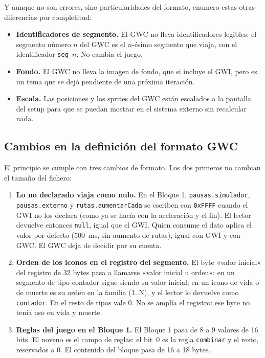 Y aunque no son errores, sino particularidades del formato, enumero estas otras diferencias por completitud:

\begin{itemize}
	\item \textbf{Identificadores de segmento.} El GWC no lleva identificadores legibles: el segmento número $n$ del GWC es el $n$-ésimo segmento que viaja, con el identificador \texttt{seg\_}$n$. No cambia el juego.
	\item \textbf{Fondo.} El GWC no lleva la imagen de fondo, que si incluye el GWI, pero es un tema que se dejó pendiente de una próxima iteración.
	\item \textbf{Escala.} Las posiciones y los sprites del GWC están escalados a la pantalla del setup para que se puedan mostrar en el sistema externo sin recalcular nada.
\end{itemize}

\subsection{Cambios en la definición del formato GWC}
\label{sec:F5I13Formato}

El principio se cumple con tres cambios de formato. Los dos primeros no cambian el tamaño del fichero:

\begin{enumerate}
	\item \textbf{Lo no declarado viaja como nulo.} En el Bloque 1, \texttt{pausas.simulador}, \texttt{pausas.externo} y \texttt{rutas.aumentarCada} se escriben con \texttt{0xFFFF} cuando el GWI no los declara (como ya se hacía con la aceleración y el fin). El lector devuelve entonces \texttt{null}, igual que el GWI. Quien consume el dato aplica el valor por defecto (500~ms, sin aumento de rutas), igual con GWI y con GWC. El GWC deja de decidir por su cuenta.

	\item \textbf{Orden de los iconos en el registro del segmento.} El byte «valor inicial» del registro de 32 bytes pasa a llamarse «valor inicial u orden»: en un segmento de tipo contador sigue siendo su valor inicial; en un icono de vida o de muerte es su orden en la familia (1..N), y el lector lo devuelve como \texttt{contador}. En el resto de tipos vale 0. No se amplía el registro: ese byte no tenía uso en vida y muerte.

	\item \textbf{Reglas del juego en el Bloque 1.} El Bloque 1 pasa de 8 a 9 valores de 16 bits. El noveno es el campo de reglas: el bit~0 es la regla \texttt{combinar} y el resto, reservados a 0. El contenido del bloque pasa de 16 a 18 bytes.
\end{enumerate}

